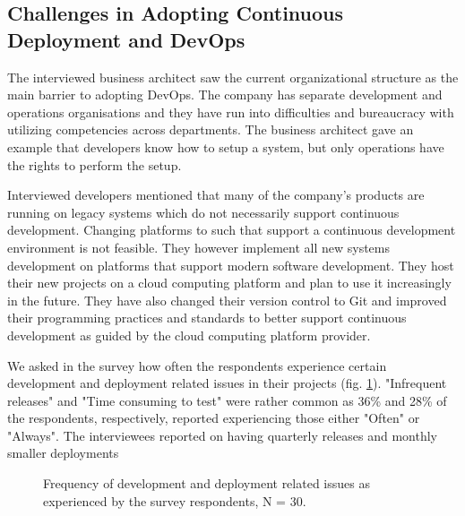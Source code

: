 \subsection{Challenges in Adopting Continuous Deployment and DevOps}
The interviewed business architect saw the current organizational structure as the main barrier to adopting DevOps. The company has separate development and operations organisations and they have run into difficulties and bureaucracy with utilizing competencies across departments. The business architect gave an example that developers know how to setup a system, but only operations have the rights to perform the setup. 

Interviewed developers mentioned that many of the company's products are running on legacy systems which do not necessarily support continuous development. Changing platforms to such that support a continuous development environment is not feasible. They however implement all new systems development on platforms that support modern software development. They host their new projects on a cloud computing platform and plan to use it increasingly in the future. They have also changed their version control to Git and improved their programming practices and standards to better support continuous development as guided by the cloud computing platform provider.

We asked in the survey how often the respondents experience certain development and deployment related issues in their projects (fig. \ref{fig:percentage_challenges}). "Infrequent releases" and "Time consuming to test" were rather common as 36\% and 28\% of the respondents, respectively, reported experiencing those either "Often" or "Always". The interviewees reported on having quarterly releases and monthly smaller deployments 

\begin{figure}%
\centering
{}
\caption{Frequency of development and deployment related issues as experienced by the survey respondents, N = 30. }
\label{fig:percentage_challenges}
\end{figure}

